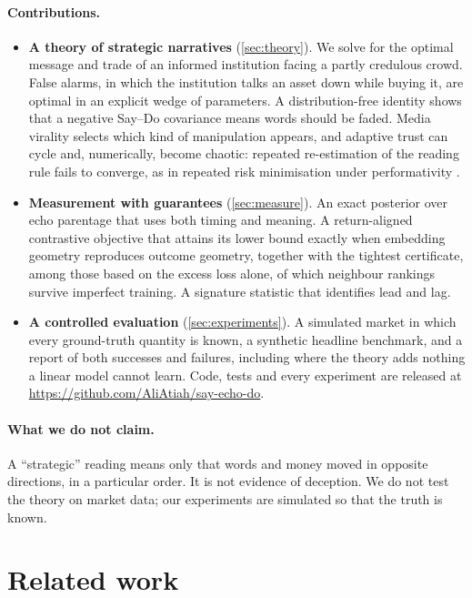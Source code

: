 \documentclass{article}
\theoremstyle{plain}
\theoremstyle{definition}
\theoremstyle{remark}
\begin{document}
\paragraph{Contributions.}
\begin{itemize}[leftmargin=1.3em]
  \item \textbf{A theory of strategic narratives} (\cref{sec:theory}). We solve for the optimal message and trade of an informed institution facing a partly credulous crowd. False alarms, in which the institution talks an asset down while buying it, are optimal in an explicit wedge of parameters. A distribution-free identity shows that a negative Say--Do covariance means words should be faded. Media virality selects which kind of manipulation appears, and adaptive trust can cycle and, numerically, become chaotic: repeated re-estimation of the reading rule fails to converge, as in repeated risk minimisation under performativity \citep{perdomo2020}.
  \item \textbf{Measurement with guarantees} (\cref{sec:measure}). An exact posterior over echo parentage that uses both timing and meaning. A return-aligned contrastive objective that attains its lower bound exactly when embedding geometry reproduces outcome geometry, together with the tightest certificate, among those based on the excess loss alone, of which neighbour rankings survive imperfect training. A signature statistic that identifies lead and lag.
  \item \textbf{A controlled evaluation} (\cref{sec:experiments}). A simulated market in which every ground-truth quantity is known, a synthetic headline benchmark, and a report of both successes and failures, including where the theory adds nothing a linear model cannot learn. Code, tests and every experiment are released at \url{https://github.com/AliAtiah/say-echo-do}.
\end{itemize}

\paragraph{What we do not claim.} A ``strategic'' reading means only that words and money moved in opposite directions, in a particular order. It is not evidence of deception. We do not test the theory on market data; our experiments are simulated so that the truth is known.

\section{Related work}\label{sec:related}
\end{document}
